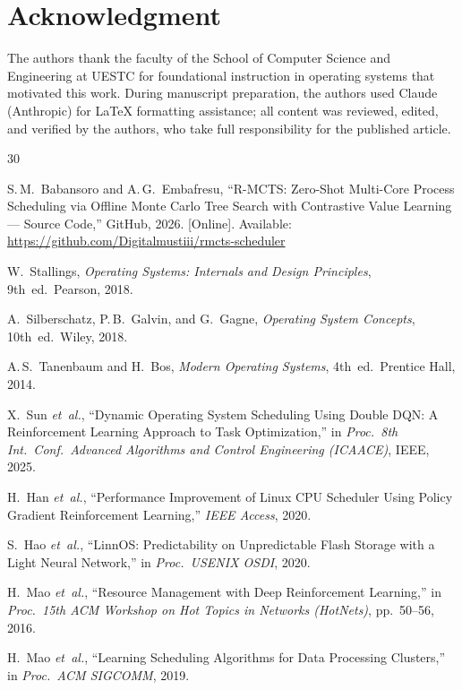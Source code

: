 \documentclass[10pt,journal,compsoc]{IEEEtran}
\begin{document}
\section*{Acknowledgment}

The authors thank the faculty of the School of Computer Science and
Engineering at UESTC for foundational instruction in operating systems
that motivated this work.
During manuscript preparation, the authors used Claude (Anthropic)
for LaTeX formatting assistance; all content was reviewed, edited,
and verified by the authors, who take full responsibility for the
published article.


\begin{thebibliography}{30}

S.\,M.~Babansoro and A.\,G.~Embafresu,
``R-MCTS: Zero-Shot Multi-Core Process Scheduling via Offline Monte Carlo
Tree Search with Contrastive Value Learning --- Source Code,''
GitHub, 2026. [Online]. Available:
\url{https://github.com/Digitalmustiii/rmcts-scheduler}

W.~Stallings, \emph{Operating Systems: Internals and Design Principles},
9th~ed.\ Pearson, 2018.

A.~Silberschatz, P.\,B.~Galvin, and G.~Gagne,
\emph{Operating System Concepts}, 10th~ed.\ Wiley, 2018.

A.\,S.~Tanenbaum and H.~Bos,
\emph{Modern Operating Systems}, 4th~ed.\ Prentice Hall, 2014.

X.~Sun \emph{et~al.}, ``Dynamic Operating System Scheduling Using Double
DQN: A Reinforcement Learning Approach to Task Optimization,'' in
\emph{Proc.\ 8th Int.\ Conf.\ Advanced Algorithms and Control Engineering
(ICAACE)}, IEEE, 2025.

H.~Han \emph{et~al.}, ``Performance Improvement of Linux CPU Scheduler
Using Policy Gradient Reinforcement Learning,'' \emph{IEEE Access}, 2020.

S.~Hao \emph{et~al.}, ``LinnOS: Predictability on Unpredictable Flash
Storage with a Light Neural Network,'' in \emph{Proc.\ USENIX OSDI}, 2020.

H.~Mao \emph{et~al.}, ``Resource Management with Deep Reinforcement
Learning,'' in \emph{Proc.\ 15th ACM Workshop on Hot Topics in Networks
(HotNets)}, pp.~50--56, 2016.

H.~Mao \emph{et~al.}, ``Learning Scheduling Algorithms for Data
Processing Clusters,'' in \emph{Proc.\ ACM SIGCOMM}, 2019.


\end{thebibliography}
\end{document}
